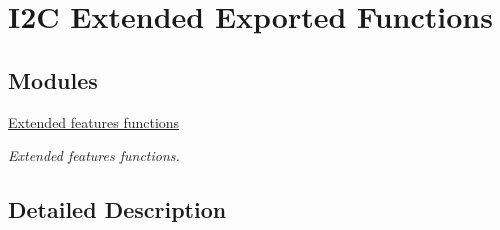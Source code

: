 \hypertarget{group___i2_c_ex___exported___functions}{}\section{I2C Extended Exported Functions}
\label{group___i2_c_ex___exported___functions}
\subsection*{Modules}
\begin{DoxyCompactItemize}
\item 
\hyperlink{group___i2_c_ex___exported___functions___group1}{Extended features functions}
\begin{DoxyCompactList}\small\item\em Extended features functions. \end{DoxyCompactList}\end{DoxyCompactItemize}


\subsection{Detailed Description}
